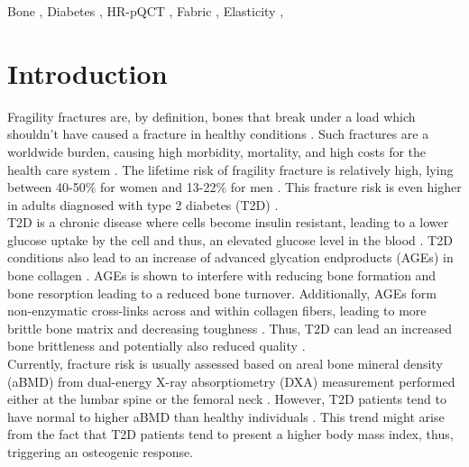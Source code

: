 \documentclass[a4paper,fleqn]{DC_ArtStyle}
\begin{document}
	\begin{keywords}
		Bone \sep%
		Diabetes \sep%
		HR-pQCT \sep%
		Fabric \sep%
		Elasticity \sep%
	\end{keywords}
	

	\begin{NoHyper}
		\maketitle
	\end{NoHyper}
	
	
	\section{Introduction}
	Fragility fractures are, by definition, bones that break under a load which shouldn't have caused a fracture in healthy conditions \cite{Kanis2001}.
	Such fractures are a worldwide burden, causing high morbidity, mortality, and high costs for the health care system \cite{Burge2007, Kanis2021}.
	The lifetime risk of fragility fracture is relatively high, lying between 40-50\% for women and 13-22\% for men \cite{Johnell2005}.
	This fracture risk is even higher in adults diagnosed with type 2 diabetes (T2D) \cite{Schwartz2001, Ahmed2005}.
	\\[0.5em]
	T2D is a chronic disease where cells become insulin resistant, leading to a lower glucose uptake by the cell and thus, an elevated glucose level in the blood \cite{Rogli2016}.
	T2D conditions also lead to an increase of advanced glycation endproducts (AGEs) in bone collagen \cite{Makita1991}.
	AGEs is shown to interfere with reducing bone formation \cite{Adami2009} and bone resorption \cite{Valcourt2007} leading to a reduced bone turnover.
	Additionally, AGEs form non-enzymatic cross-links across and within collagen fibers, leading to more brittle bone matrix and decreasing toughness \cite{Tang2009}.
	Thus, T2D can lead an increased bone brittleness and potentially also reduced quality \cite{Rubin2016}.
	\\[0.5em]
	Currently, fracture risk is usually assessed based on areal bone mineral density (aBMD) from dual-energy X-ray absorptiometry (DXA) measurement performed either at the lumbar spine or the femoral neck \cite{Nuti2018}.
	However, T2D patients tend to have normal to higher aBMD than healthy individuals \cite{Ma2012}.
	This trend might arise from the fact that T2D patients tend to present a higher body mass index, thus, triggering an osteogenic response.
\end{document}

